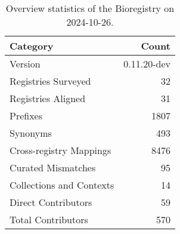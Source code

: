 \begin{table}
\caption{Overview statistics of the Bioregistry on 2024-10-26.}
\label{tab:bioregistry-summary}
\begin{tabular}{lr}
\toprule
Category & Count \\
\midrule
Version & 0.11.20-dev \\
Registries Surveyed & 32 \\
Registries Aligned & 31 \\
Prefixes & 1807 \\
Synonyms & 493 \\
Cross-registry Mappings & 8476 \\
Curated Mismatches & 95 \\
Collections and Contexts & 14 \\
Direct Contributors & 59 \\
Total Contributors & 570 \\
\bottomrule
\end{tabular}
\end{table}
